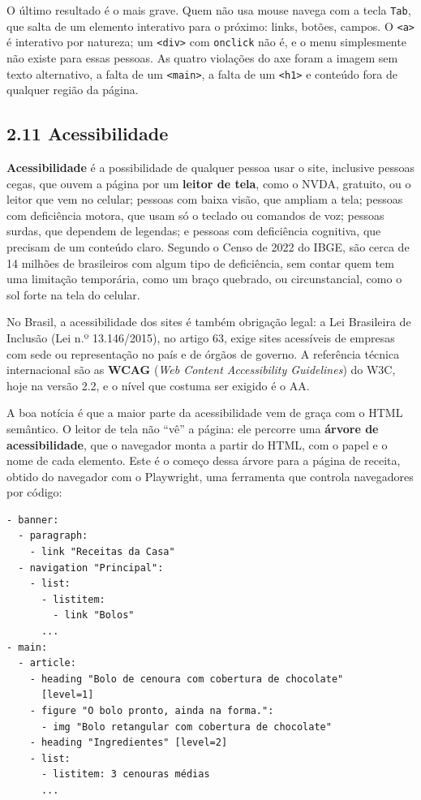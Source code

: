 O último resultado é o mais grave. Quem não usa mouse navega com a tecla \texttt{Tab}, que salta de um elemento interativo para o próximo: links, botões, campos. O \texttt{<a>} é interativo por natureza; um \texttt{<div>} com \texttt{onclick} não é, e o menu simplesmente não existe para essas pessoas. As quatro violações do axe foram a imagem sem texto alternativo, a falta de um \texttt{<main>}, a falta de um \texttt{<h1>} e conteúdo fora de qualquer região da página.

\subsection{2.11 Acessibilidade}

\textbf{Acessibilidade} é a possibilidade de qualquer pessoa usar o site, inclusive pessoas cegas, que ouvem a página por um \textbf{leitor de tela}, como o NVDA, gratuito, ou o leitor que vem no celular; pessoas com baixa visão, que ampliam a tela; pessoas com deficiência motora, que usam só o teclado ou comandos de voz; pessoas surdas, que dependem de legendas; e pessoas com deficiência cognitiva, que precisam de um conteúdo claro. Segundo o Censo de 2022 do IBGE, são cerca de 14 milhões de brasileiros com algum tipo de deficiência, sem contar quem tem uma limitação temporária, como um braço quebrado, ou circunstancial, como o sol forte na tela do celular.

No Brasil, a acessibilidade dos sites é também obrigação legal: a Lei Brasileira de Inclusão (Lei n.º 13.146/2015), no artigo 63, exige sites acessíveis de empresas com sede ou representação no país e de órgãos de governo. A referência técnica internacional são as \textbf{WCAG} (\textit{Web Content Accessibility Guidelines}) do W3C, hoje na versão 2.2, e o nível que costuma ser exigido é o AA.

A boa notícia é que a maior parte da acessibilidade vem de graça com o HTML semântico. O leitor de tela não ``vê'' a página: ele percorre uma \textbf{árvore de acessibilidade}, que o navegador monta a partir do HTML, com o papel e o nome de cada elemento. Este é o começo dessa árvore para a página de receita, obtido do navegador com o Playwright, uma ferramenta que controla navegadores por código:

\begin{codigo}
\begin{Verbatim}[breaklines=true, breaksymbolleft={}, fontsize=\footnotesize]
- banner:
  - paragraph:
    - link "Receitas da Casa"
  - navigation "Principal":
    - list:
      - listitem:
        - link "Bolos"
      ...
- main:
  - article:
    - heading "Bolo de cenoura com cobertura de chocolate"
      [level=1]
    - figure "O bolo pronto, ainda na forma.":
      - img "Bolo retangular com cobertura de chocolate"
    - heading "Ingredientes" [level=2]
    - list:
      - listitem: 3 cenouras médias
      ...
\end{Verbatim}
\end{codigo}

